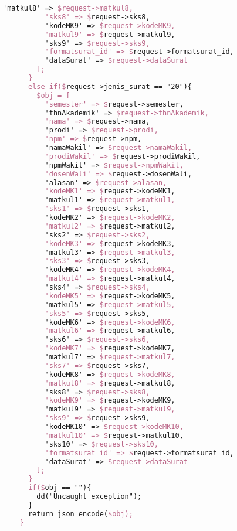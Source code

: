 \begin{lstlisting}[language=tex,basicstyle=\tiny,caption=PesanansuratController.php]
          'matkul8' => $request->matkul8,
          'sks8' => $request->sks8,
          'kodeMK9' => $request->kodeMK9,
          'matkul9' => $request->matkul9,
          'sks9' => $request->sks9,
          'formatsurat_id' => $request->formatsurat_id,
          'dataSurat' => $request->dataSurat
        ];
      }
      else if($request->jenis_surat == "20"){
        $obj = [
          'semester' => $request->semester,
          'thnAkademik' => $request->thnAkademik,
          'nama' => $request->nama,
          'prodi' => $request->prodi,
          'npm' => $request->npm,
          'namaWakil' => $request->namaWakil,
          'prodiWakil' => $request->prodiWakil,
          'npmWakil' => $request->npmWakil,
          'dosenWali' => $request->dosenWali,
          'alasan' => $request->alasan,
          'kodeMK1' => $request->kodeMK1,
          'matkul1' => $request->matkul1,
          'sks1' => $request->sks1,
          'kodeMK2' => $request->kodeMK2,
          'matkul2' => $request->matkul2,
          'sks2' => $request->sks2,
          'kodeMK3' => $request->kodeMK3,
          'matkul3' => $request->matkul3,
          'sks3' => $request->sks3,
          'kodeMK4' => $request->kodeMK4,
          'matkul4' => $request->matkul4,
          'sks4' => $request->sks4,
          'kodeMK5' => $request->kodeMK5,
          'matkul5' => $request->matkul5,
          'sks5' => $request->sks5,
          'kodeMK6' => $request->kodeMK6,
          'matkul6' => $request->matkul6,
          'sks6' => $request->sks6,
          'kodeMK7' => $request->kodeMK7,
          'matkul7' => $request->matkul7,
          'sks7' => $request->sks7,
          'kodeMK8' => $request->kodeMK8,
          'matkul8' => $request->matkul8,
          'sks8' => $request->sks8,
          'kodeMK9' => $request->kodeMK9,
          'matkul9' => $request->matkul9,
          'sks9' => $request->sks9,
          'kodeMK10' => $request->kodeMK10,
          'matkul10' => $request->matkul10,
          'sks10' => $request->sks10,
          'formatsurat_id' => $request->formatsurat_id,
          'dataSurat' => $request->dataSurat
        ];
      }
      if($obj == ""){
        dd("Uncaught exception");
      }
      return json_encode($obj);
    }


\end{lstlisting}
